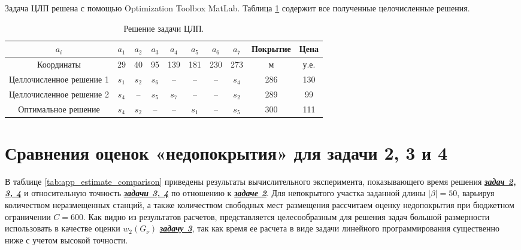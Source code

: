 Задача ЦЛП решена с помощью Optimization Toolbox MatLab. Таблица \cref{tab:part3_ilp_solution} содержит все полученные целочисленные решения.


\begin{table}[h!]\tiny\centering
  \begin{tabular}{|c||c|c|c|c|c|c|c||c|c|}\hline
    $a_i$ & $a_1$ &  $a_2$ & $a_3$ & $a_4$ & $a_5$ & $a_6$ & $a_7$  & Покрытие & Цена \\ \hline 
    Координаты & 29 & 40 & 95 & 139 & 181 & 230 & 273 & м & у.е.\\ \hline \hline
    Целлочисленное решение 1 & $s_1$ & $s_2$ & $s_6$ & -- & -- & -- & $s_4$ & 286 & 130\\ 
    Целлочисленное решение 2 & $s_4$ & -- & $s_5$ & $s_7$ & -- & -- & $s_2$ & 289 & 99\\
    Оптимальное решение & $s_4$ & $s_2$ & -- & -- & $s_1$ & -- & $s_5$ & 300 & 111 \\ \hline
\end{tabular}\caption{Решение задачи ЦЛП.}\label{tab:part3_ilp_solution}
\end{table}



\chapter{Сравнения оценок «недопокрытия» для задачи 2, 3 и 4}\label{app:task_234}

В таблице \cref{tab:app_estimate_comparison} приведены результаты вычислительного эксперимента, показывающего время решения \underline{\textit{\textbf{задач 2, 3, 4}}} и относительную точность \underline{\textit{\textbf{задачи 3, 4}}} по отношению к \underline{\textit{\textbf{задаче 2}}}.
Для непокрытого участка заданной длины $|\beta| = 50$, варьируя количеством неразмещенных станций, а также количеством свободных мест размещения рассчитаем оценку недопокрытия при бюджетном ограничении $C=600$.
Как видно из результатов расчетов, представляется целесообразным для решения задач большой размерности использовать в качестве оценки $w_2 (G_\nu )$ \underline{\textit{\textbf{задачу 3}}}, так как время ее расчета в виде задачи линейного программирования существенно ниже с учетом высокой точности.


